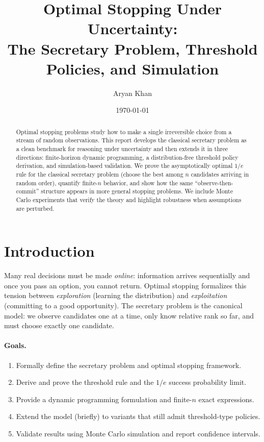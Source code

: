 \documentclass[11pt]{article}
\title{Optimal Stopping Under Uncertainty:\\
The Secretary Problem, Threshold Policies, and Simulation}
\author{Aryan Khan}
\date{\today}
\theoremstyle{plain}
\theoremstyle{definition}
\theoremstyle{remark}
\newcommand{\1}{\mathbf{1}}
\begin{document}
\maketitle
\tableofcontents
\newpage

\begin{abstract}
Optimal stopping problems study how to make a single irreversible choice from a stream of random observations.
This report develops the classical secretary problem as a clean benchmark for reasoning under uncertainty and
then extends it in three directions: finite-horizon dynamic programming, a distribution-free threshold policy
derivation, and simulation-based validation. We prove the asymptotically optimal $1/e$ rule for the classical
secretary problem (choose the best among $n$ candidates arriving in random order), quantify finite-$n$ behavior,
and show how the same ``observe-then-commit'' structure appears in more general stopping problems.
We include Monte Carlo experiments that verify the theory and highlight robustness when assumptions are perturbed.
\end{abstract}

\section{Introduction}
Many real decisions must be made \emph{online}: information arrives sequentially and once you pass an option,
you cannot return. Optimal stopping formalizes this tension between \emph{exploration} (learning the distribution)
and \emph{exploitation} (committing to a good opportunity). The secretary problem is the canonical model:
we observe candidates one at a time, only know relative rank so far, and must choose exactly one candidate.

\paragraph{Goals.}
\begin{enumerate}[label=\arabic*.]
\item Formally define the secretary problem and optimal stopping framework.
\item Derive and prove the threshold rule and the $1/e$ success probability limit.
\item Provide a dynamic programming formulation and finite-$n$ exact expressions.
\item Extend the model (briefly) to variants that still admit threshold-type policies.
\item Validate results using Monte Carlo simulation and report confidence intervals.
\end{enumerate}
\end{document}
